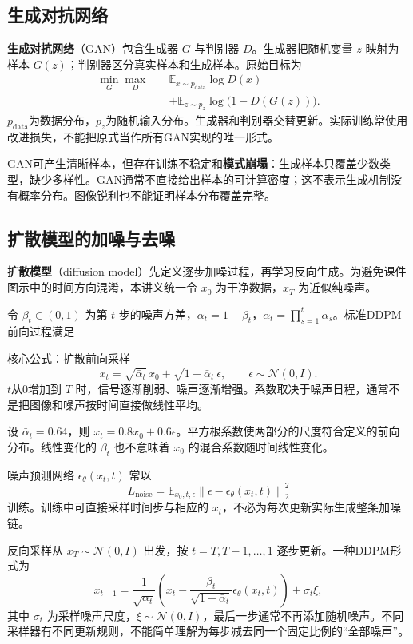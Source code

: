 \documentclass[UTF8,fontset=none,zihao=-4,a4paper]{ctexart}
\newcommand{\term}[1]{\textbf{#1}}
\begin{document}
\subsection{生成对抗网络}
\term{生成对抗网络}（GAN）包含生成器 $G$ 与判别器 $D$。生成器把随机变量 $z$ 映射为样本 $G(z)$；判别器区分真实样本和生成样本。原始目标为
\begin{align*}
\min_G\max_D\quad
&\mathbb E_{x\sim p_{\mathrm{data}}}\log D(x)\\
&+\mathbb E_{z\sim p_z}\log\bigl(1-D(G(z))\bigr).
\end{align*}
$p_{\mathrm{data}}$为数据分布，$p_z$为随机输入分布。生成器和判别器交替更新。实际训练常使用改进损失，不能把原式当作所有GAN实现的唯一形式。

GAN可产生清晰样本，但存在训练不稳定和\term{模式崩塌}：生成样本只覆盖少数类型，缺少多样性。GAN通常不直接给出样本的可计算密度；这不表示生成机制没有概率分布。图像锐利也不能证明样本分布覆盖完整。

\subsection{扩散模型的加噪与去噪}
\term{扩散模型}（diffusion model）先定义逐步加噪过程，再学习反向生成。为避免课件图示中的时间方向混淆，本讲义统一令 $x_0$ 为干净数据，$x_T$ 为近似纯噪声。

令 $\beta_t\in(0,1)$ 为第 $t$ 步的噪声方差，$\alpha_t=1-\beta_t$，$\bar\alpha_t=\prod_{s=1}^t\alpha_s$。标准DDPM前向过程满足
\begin{infobox}{核心公式：扩散前向采样}
\[
x_t=\sqrt{\bar\alpha_t}\,x_0+\sqrt{1-\bar\alpha_t}\,\epsilon,
\qquad\epsilon\sim\mathcal N(0,I).
\]
$t$从0增加到 $T$ 时，信号逐渐削弱、噪声逐渐增强。系数取决于噪声日程，通常不是把图像和噪声按时间直接做线性平均。
\end{infobox}
设 $\bar\alpha_t=0.64$，则 $x_t=0.8x_0+0.6\epsilon$。平方根系数使两部分的尺度符合定义的前向分布。线性变化的 $\beta_t$ 也不意味着 $x_0$ 的混合系数随时间线性变化。

噪声预测网络 $\epsilon_\theta(x_t,t)$ 常以
\[
L_{\mathrm{noise}}=\mathbb E_{x_0,t,\epsilon}
\left\|\epsilon-\epsilon_\theta(x_t,t)\right\|_2^2
\]
训练。训练中可直接采样时间步与相应的 $x_t$，不必为每次更新实际生成整条加噪链。

反向采样从 $x_T\sim\mathcal N(0,I)$ 出发，按 $t=T,T-1,\ldots,1$ 逐步更新。一种DDPM形式为
\[
x_{t-1}=\frac1{\sqrt{\alpha_t}}
\left(x_t-\frac{\beta_t}{\sqrt{1-\bar\alpha_t}}
\epsilon_\theta(x_t,t)\right)+\sigma_t\xi,
\]
其中 $\sigma_t$ 为采样噪声尺度，$\xi\sim\mathcal N(0,I)$，最后一步通常不再添加随机噪声。不同采样器有不同更新规则，不能简单理解为每步减去同一个固定比例的“全部噪声”。
\end{document}
